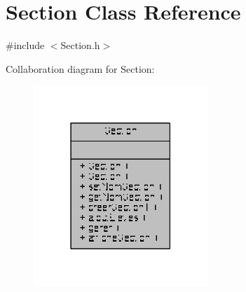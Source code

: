\hypertarget{class_section}{\section{Section Class Reference}
\label{class_section}
}


{\ttfamily \#include $<$Section.\+h$>$}



Collaboration diagram for Section\+:\nopagebreak
\begin{figure}[H]
\begin{center}
\leavevmode
\includegraphics[width=186pt]{class_section__coll__graph}
\end{center}
\end{figure}
